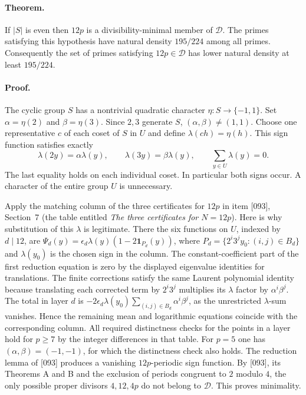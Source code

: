 \documentclass[11pt]{article}
\begin{document}
\paragraph{Theorem.}
If $|S|$ is even then $12p$ is a divisibility-minimal member of
$\mathcal D$. The primes satisfying this hypothesis have natural density
$195/224$ among all primes. Consequently the set of primes satisfying
$12p\in\mathcal D$ has lower natural density at least $195/224$.

\paragraph{Proof.}
The cyclic group $S$ has a nontrivial quadratic character
$\eta:S\to\{-1,1\}$. Set $\alpha=\eta(2)$ and $\beta=\eta(3)$.
Since $2,3$ generate $S$, $(\alpha,\beta)\ne(1,1)$.
Choose one representative $c$ of each coset of $S$ in $U$ and define
$\lambda(ch)=\eta(h)$. This sign function satisfies exactly
\[
 \lambda(2y)=\alpha\lambda(y),\qquad
 \lambda(3y)=\beta\lambda(y),\qquad
 \sum_{y\in U}\lambda(y)=0.
\]
The last equality holds on each individual coset. In particular both
signs occur. A character of the entire group $U$ is unnecessary.

Apply the matching column of the three certificates for $12p$ in item
[093], Section~7 (the table entitled \emph{The three certificates for
$N=12p$}). Here is why substitution of this $\lambda$ is legitimate.
There the six functions on $U$, indexed by $d\mid12$, are
$\Psi_d(y)=\epsilon_d\lambda(y)(1-2{\boldsymbol1}_{P_d}(y))$,
where $P_d=\{2^i3^jy_0:(i,j)\in B_d\}$ and $\lambda(y_0)$ is the chosen
sign in the column. The constant-coefficient part of the first reduction
equation is zero by the displayed eigenvalue identities for translations.
The finite corrections satisfy the same Laurent polynomial identity
because translating each corrected term by $2^i3^j$ multiplies its
$\lambda$ factor by $\alpha^i\beta^j$. The total in layer $d$ is
$-2\epsilon_d\lambda(y_0)\sum_{(i,j)\in B_d}\alpha^i\beta^j$,
as the unrestricted $\lambda$-sum vanishes. Hence the remaining
mean and logarithmic equations coincide with the corresponding column.
All required distinctness checks for the points in a layer hold for
$p\ge7$ by the integer differences in that table. For $p=5$ one has
$(\alpha,\beta)=(-1,-1)$, for which the distinctness check also holds.
The reduction lemma of [093] produces a vanishing $12p$-periodic
sign function. By [093], its Theorems A and B and the exclusion of
periods congruent to $2$ modulo $4$, the only possible proper divisors
$4,12,4p$ do not belong to $\mathcal D$. This proves minimality.
\end{document}
